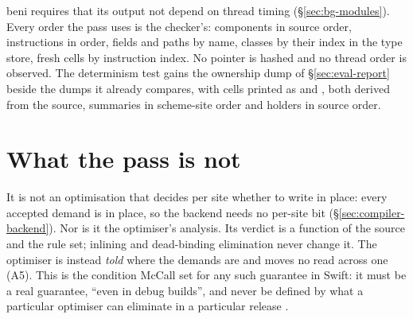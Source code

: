 beni requires that its output not depend on thread timing (\S\ref{sec:bg-modules}). Every order the
pass uses is the checker's: components in source order, instructions in order, fields and paths by
name, classes by their index in the type store, fresh cells by instruction index. No pointer is hashed
and no thread order is observed. The determinism test gains the ownership dump of
\S\ref{sec:eval-report} beside the dumps it already compares, with cells printed as
 and , both derived from the source, summaries in
scheme-site order and holders in source order.

\section{What the pass is not}
\label{sec:inf-not}

It is not an optimisation that decides per site whether to write in place: every accepted demand is
in place, so the backend needs no per-site bit (\S\ref{sec:compiler-backend}). Nor is it the
optimiser's analysis. Its verdict is a function of the source and the rule set; inlining and
dead-binding elimination never change it. The optimiser is instead \emph{told} where the demands are
and moves no read across one (A5). This is the condition McCall set for any such guarantee in Swift:
it must be a real guarantee, ``even in debug builds'', and never be defined by what a particular
optimiser can eliminate in a particular release \citep{swift2025explicitcopies}.
